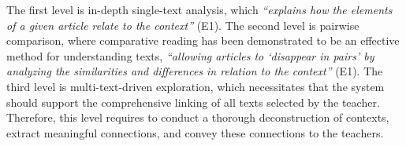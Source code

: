 The first level is in-depth single-text analysis, which \textit{``explains how the elements of a given article relate to the context''} (E1). 
The second level is pairwise comparison, where comparative reading has been demonstrated to be an effective method for understanding texts, \textit{``allowing articles to `disappear in pairs' by analyzing the similarities and differences in relation to the context''} (E1). 
The third level is multi-text-driven exploration, which necessitates that the system should support the comprehensive linking of all texts selected by the teacher. Therefore, this level requires \name{} to conduct a thorough deconstruction of contexts, extract meaningful connections, and convey these connections to the teachers. 

